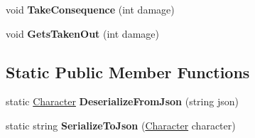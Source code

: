 \begin{DoxyCompactItemize}
\item 
\hypertarget{class_dungeon_crawler_1_1_character_1_1_character_a6c2305e906fbcf5b7bd581c7f695318d}{}void {\bfseries Take\+Consequence} (int damage)\label{class_dungeon_crawler_1_1_character_1_1_character_a6c2305e906fbcf5b7bd581c7f695318d}

\item 
\hypertarget{class_dungeon_crawler_1_1_character_1_1_character_ace129083908dc966bce4cbae4c8048c9}{}void {\bfseries Gets\+Taken\+Out} (int damage)\label{class_dungeon_crawler_1_1_character_1_1_character_ace129083908dc966bce4cbae4c8048c9}

\end{DoxyCompactItemize}
\subsection*{Static Public Member Functions}
\begin{DoxyCompactItemize}
\item 
\hypertarget{class_dungeon_crawler_1_1_character_1_1_character_afa98f6089012bcc1077fbae13e6abfd5}{}static \hyperlink{class_dungeon_crawler_1_1_character_1_1_character}{Character} {\bfseries Deserialize\+From\+Json} (string json)\label{class_dungeon_crawler_1_1_character_1_1_character_afa98f6089012bcc1077fbae13e6abfd5}

\item 
\hypertarget{class_dungeon_crawler_1_1_character_1_1_character_a0e4ae66b1518972809a7e41a59b0be36}{}static string {\bfseries Serialize\+To\+Json} (\hyperlink{class_dungeon_crawler_1_1_character_1_1_character}{Character} character)\label{class_dungeon_crawler_1_1_character_1_1_character_a0e4ae66b1518972809a7e41a59b0be36}

\end{DoxyCompactItemize}
